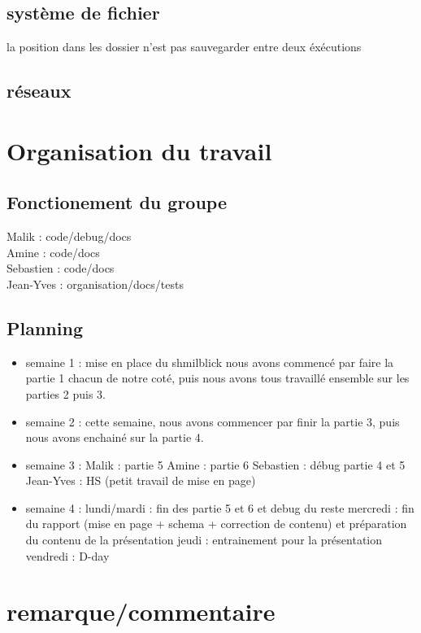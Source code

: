 \documentclass{article}
\begin{document}
	\subsection{système de fichier}
la position dans les dossier n'est pas sauvegarder entre deux éxécutions

	\subsection{réseaux}

\section{Organisation du travail}
	\subsection{Fonctionement du groupe}
		Malik : code/debug/docs\\
		Amine : code/docs\\
		Sebastien : code/docs\\
		Jean-Yves : organisation/docs/tests\\

	\subsection{Planning}
	\begin{itemize}
		\item semaine 1 :
			\subitem mise en place du shmilblick
			\subitem nous avons commencé par faire la partie 1 chacun de notre coté,
			\subitem puis nous avons tous travaillé ensemble sur les parties 2 puis 3.

		\item semaine 2 :
			\subitem cette semaine, nous avons commencer par finir la partie 3, puis nous avons enchainé sur la partie 4.

		\item semaine 3 :
			\subitem Malik : partie 5
			\subitem Amine : partie 6
			\subitem Sebastien : débug partie 4 et 5
			\subitem Jean-Yves : HS (petit travail de mise en page)

		\item semaine 4 :
			\subitem lundi/mardi : fin des partie 5 et 6 et debug du reste
			\subitem mercredi : fin du rapport (mise en page + schema + correction de contenu) et préparation du contenu de la présentation
			\subitem jeudi : entrainement pour la présentation
			\subitem vendredi : D-day
	\end{itemize}

\section{remarque/commentaire}
\end{document}
